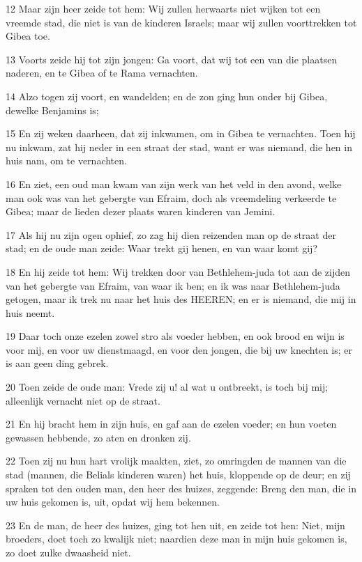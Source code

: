 \par 12 Maar zijn heer zeide tot hem: Wij zullen herwaarts niet wijken tot een vreemde stad, die niet is van de kinderen Israels; maar wij zullen voorttrekken tot Gibea toe.
\par 13 Voorts zeide hij tot zijn jongen: Ga voort, dat wij tot een van die plaatsen naderen, en te Gibea of te Rama vernachten.
\par 14 Alzo togen zij voort, en wandelden; en de zon ging hun onder bij Gibea, dewelke Benjamins is;
\par 15 En zij weken daarheen, dat zij inkwamen, om in Gibea te vernachten. Toen hij nu inkwam, zat hij neder in een straat der stad, want er was niemand, die hen in huis nam, om te vernachten.
\par 16 En ziet, een oud man kwam van zijn werk van het veld in den avond, welke man ook was van het gebergte van Efraim, doch als vreemdeling verkeerde te Gibea; maar de lieden dezer plaats waren kinderen van Jemini.
\par 17 Als hij nu zijn ogen ophief, zo zag hij dien reizenden man op de straat der stad; en de oude man zeide: Waar trekt gij henen, en van waar komt gij?
\par 18 En hij zeide tot hem: Wij trekken door van Bethlehem-juda tot aan de zijden van het gebergte van Efraim, van waar ik ben; en ik was naar Bethlehem-juda getogen, maar ik trek nu naar het huis des HEEREN; en er is niemand, die mij in huis neemt.
\par 19 Daar toch onze ezelen zowel stro als voeder hebben, en ook brood en wijn is voor mij, en voor uw dienstmaagd, en voor den jongen, die bij uw knechten is; er is aan geen ding gebrek.
\par 20 Toen zeide de oude man: Vrede zij u! al wat u ontbreekt, is toch bij mij; alleenlijk vernacht niet op de straat.
\par 21 En hij bracht hem in zijn huis, en gaf aan de ezelen voeder; en hun voeten gewassen hebbende, zo aten en dronken zij.
\par 22 Toen zij nu hun hart vrolijk maakten, ziet, zo omringden de mannen van die stad (mannen, die Belials kinderen waren) het huis, kloppende op de deur; en zij spraken tot den ouden man, den heer des huizes, zeggende: Breng den man, die in uw huis gekomen is, uit, opdat wij hem bekennen.
\par 23 En de man, de heer des huizes, ging tot hen uit, en zeide tot hen: Niet, mijn broeders, doet toch zo kwalijk niet; naardien deze man in mijn huis gekomen is, zo doet zulke dwaasheid niet.
